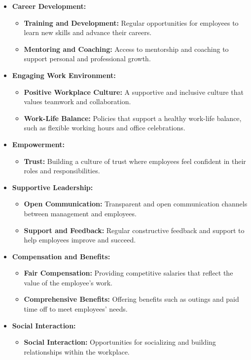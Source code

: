 \begin{itemize}
\item \textbf{Career Development:}
\begin{itemize}
    \item \textbf{Training and Development:} Regular opportunities for employees to learn new skills and advance their careers.
    \item \textbf{Mentoring and Coaching:} Access to mentorship and coaching to support personal and professional growth.
\end{itemize}

\item \textbf{Engaging Work Environment:}
\begin{itemize}
    \item \textbf{Positive Workplace Culture:} A supportive and inclusive culture that values teamwork and collaboration.
    \item \textbf{Work-Life Balance:} Policies that support a healthy work-life balance, such as flexible working hours and office celebrations.
\end{itemize}

\item \textbf{Empowerment:}
\begin{itemize}
    \item \textbf{Trust:} Building a culture of trust where employees feel confident in their roles and responsibilities.
\end{itemize}

\item \textbf{Supportive Leadership:}
\begin{itemize}
    \item \textbf{Open Communication:} Transparent and open communication channels between management and employees.
    \item \textbf{Support and Feedback:} Regular constructive feedback and support to help employees improve and succeed.
\end{itemize}

\item \textbf{Compensation and Benefits:}
\begin{itemize}
    \item \textbf{Fair Compensation:} Providing competitive salaries that reflect the value of the employee's work.
    \item \textbf{Comprehensive Benefits:} Offering benefits such as outings and paid time off to meet employees' needs.
\end{itemize}

\item \textbf{Social Interaction:}
\begin{itemize}
    \item \textbf{Social Interaction:} Opportunities for socializing and building relationships within the workplace.
\end{itemize}
\end{itemize}